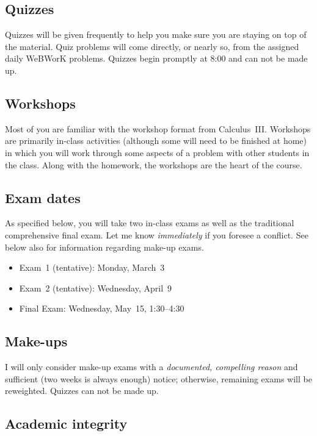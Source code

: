 \documentclass[symmetric]{tufte-handout}
\begin{document}
\subsection{Quizzes}

Quizzes will be given frequently to help you make sure you are staying on top
of the material. Quiz problems will come directly, or nearly so, from the
assigned daily WeBWorK problems. Quizzes begin promptly at 8:00 and can not be
made up.

\subsection{Workshops}

Most of you are familiar with the workshop format from Calculus~III. Workshops
are primarily in-class activities (although some will need to be finished at home)
in which you will work through some aspects of a problem with other students in
the class. Along with the homework, the workshops are the heart of the course.

\subsection{Exam dates}

As specified below, you will take two in-class exams as well as the
traditional comprehensive final exam. Let me know \emph{immediately} if you
foresee a conflict. See below also for information regarding make-up exams.

\begin{itemize}
   \item Exam~1 (tentative): Monday, March~3
   \item Exam~2 (tentative): Wednesday, April~9
   \item Final Exam: Wednesday, May~15, 1:30–4:30
\end{itemize}
%
\subsection{Make-ups}

I will only consider make-up exams with a \emph{documented, compelling reason}
and sufficient (two weeks is always enough) notice; otherwise, remaining exams
will be reweighted.  Quizzes can not be made up.

\subsection{Academic integrity}
\end{document}
